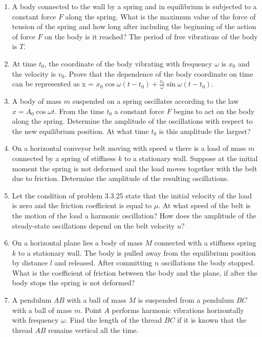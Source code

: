 \documentclass{article}
\begin{document}
\begin{enumerate}[label=3.3.\arabic*]
\item A body connected to the wall by a spring and in equilibrium is subjected to a constant force $F$ along the spring. What is the maximum value of the force of tension of the spring and how long after including the beginning of the action of force $F$ on the body is it reached? The period of free vibrations of the body is $T$.

\item At time $t_0$, the coordinate of the body vibrating with frequency $\omega$ is $x_0$ and the velocity is $v_0$. Prove that the dependence of the body coordinate on time can be represented as x = $x_0 \cos{\omega(t - t_0)} + \frac{v_0}{\omega} \sin{\omega (t - t_0)}$.

\item A body of mass $m$ suspended on a spring oscillates according to the law $x = A_0 \cos{\omega t}$. From the time $t_0$ a constant force $F$ begins to act on the body along the spring. Determine the amplitude of the oscillations with respect to the new equilibrium position. At what time $t_0$ is this amplitude the largest?

\item On a horizontal conveyor belt moving with speed $u$ there is a load of mass $m$ connected by a spring of stiffness $k$ to a stationary wall. Suppose at the initial moment the spring is not deformed and the load moves together with the belt due to friction. Determine the amplitude of the resulting oscillations.

\item Let the condition of problem 3.3.25 state that the initial velocity of the load is zero and the friction coefficient is equal to $\mu$. At what speed of the belt is the motion of the load a harmonic oscillation? How does the amplitude of the steady-state oscillations depend on the belt velocity $u$?

\item On a horizontal plane lies a body of mass $M$ connected with a stiffness spring $k$ to a stationary wall. The body is pulled away from the equilibrium position by distance $l$ and released. After committing $n$ oscillations the body stopped. What is the coefficient of friction between the body and the plane, if after the body stops the spring is not deformed?

\item A pendulum $AB$ with a ball of mass $M$ is suspended from a pendulum $BC$ with a ball of mass $m$. Point $A$ performs harmonic vibrations horizontally with frequency $\omega$. Find the length of the thread $BC$ if it is known that the thread $AB$ remains vertical all the time.


\end{enumerate}
\end{document}
